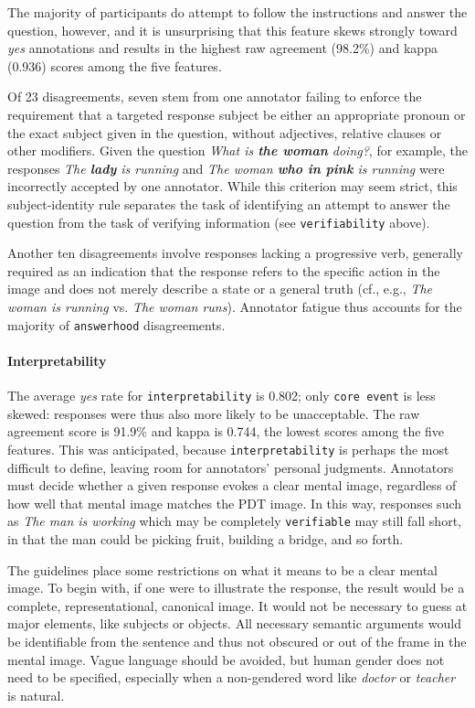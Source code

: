 \documentclass[11pt,a4paper]{article}
\newcommand{\feat}[1]{\texttt{#1}}
\begin{document}
The majority of participants do attempt to follow the instructions and answer the question, however, and it is unsurprising that this feature skews strongly toward \textit{yes} annotations and results in the highest raw agreement (98.2\%) and kappa (0.936) scores among the five features.

Of 23 disagreements, seven stem from one annotator failing to enforce the requirement that a targeted response subject be either an appropriate pronoun or the exact subject given in the question, without adjectives, relative clauses or other modifiers. Given the question \textit{What is \textbf{the woman} doing?}, for example, the responses \textit{The \textbf{lady} is running} and \textit{The woman \textbf{who in pink} is running} were incorrectly accepted by one annotator.  While this criterion may seem strict, this subject-identity rule separates the task of identifying an attempt to answer the question from the task of verifying information (see \feat{verifiability} above).

Another ten disagreements involve responses lacking a progressive verb, generally required as an indication that the response refers to the specific action in the image and does not merely describe a state or a general truth (cf., e.g., \textit{The woman is running} vs. \textit{The woman runs}). Annotator fatigue thus accounts for the majority of \feat{answerhood} disagreements.
\smallskip

\paragraph{Interpretability} The average \textit{yes} rate for \feat{interpretability} is 0.802; only \feat{core event} is less skewed: responses were thus also more likely to be unacceptable.
%
The raw agreement score is 91.9\% and kappa is 0.744, the lowest scores among the five features. This was anticipated, because \feat{interpretability} is perhaps the most difficult to define, leaving room for annotators' personal judgments. Annotators must decide whether a given response evokes a clear mental image, regardless of how well that mental image matches the PDT image.  In this way, responses such as \textit{The man is working} which may %
be completely \feat{verifiable} may still fall short, in that the man could be picking fruit, building a bridge, and so forth.

The guidelines place some restrictions on what it means to be a clear mental image. To begin with, if one were to illustrate the response, the result would be a complete, representational, canonical image. It would not be necessary to guess at major elements, like subjects or objects. 
%
All necessary semantic arguments would be identifiable from the sentence and thus not obscured or out of the frame in the mental image.
%
Vague language should be avoided, but human gender does not need to be specified, especially when a non-gendered word like \textit{doctor} or \textit{teacher} is natural. 
\end{document}
